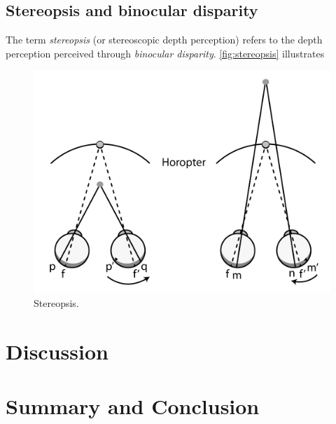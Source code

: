 \subsection{Stereopsis and binocular disparity}
The term \textit{stereopsis} (or stereoscopic depth perception) refers to the depth perception perceived through \textit{binocular disparity}\citep{sensationPerception,seeingInThreeDimensions}. \autoref{fig:stereopsis} illustrates 
\begin{figure}[H]
	\centering
	\includegraphics[width=0.8\linewidth]{figure/Analysis/stereopsis.png}
	\caption{Stereopsis.}
	\label{fig:stereopsis}
\end{figure}


\section{Discussion}

\section{Summary and Conclusion}


